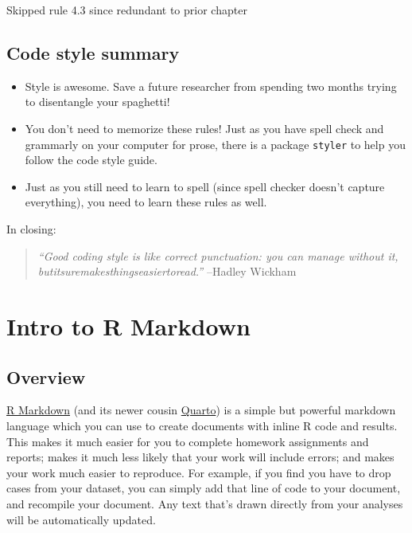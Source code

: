 \documentclass[
  letterpaper,
  DIV=11,
  numbers=noendperiod]{scrreprt}
\providecommand{\tightlist}{%
  \setlength{\itemsep}{0pt}\setlength{\parskip}{0pt}}\usepackage{longtable,booktabs,array}
\begin{document}
Skipped rule 4.3 since redundant to prior chapter

\section{Code style summary}\label{code-style-summary}

\begin{itemize}
\tightlist
\item
  Style is awesome. Save a future researcher from spending two months
  trying to disentangle your spaghetti!
\item
  You don't need to memorize these rules! Just as you have spell check
  and grammarly on your computer for prose, there is a package
  \texttt{styler} to help you follow the code style guide.
\item
  Just as you still need to learn to spell (since spell checker doesn't
  capture everything), you need to learn these rules as well.
\end{itemize}

In closing:

\begin{quote}
\emph{``Good coding style is like correct punctuation: you can manage
without it, butitsuremakesthingseasiertoread.''} --Hadley Wickham
\end{quote}

\chapter{Intro to R Markdown}\label{intro-to-r-markdown}

\section{Overview}\label{overview-1}

\href{https://bookdown.org/yihui/rmarkdown/}{R Markdown} (and its newer
cousin \href{https://quarto.org/}{Quarto}) is a simple but powerful
markdown language which you can use to create documents with inline R
code and results. This makes it much easier for you to complete homework
assignments and reports; makes it much less likely that your work will
include errors; and makes your work much easier to reproduce. For
example, if you find you have to drop cases from your dataset, you can
simply add that line of code to your document, and recompile your
document. Any text that's drawn directly from your analyses will be
automatically updated.
\end{document}
